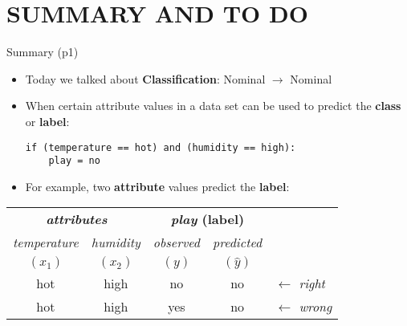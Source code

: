 \documentclass[handout]{beamer}
\newcommand{\strong}[1]{\textbf{\color{teal} #1}}
\newcommand{\stronger}[1]{\textbf{\color{purple} #1}}
\begin{document}
\section*{SUMMARY AND TO DO}
\begin{frame}[fragile]{Summary (p1)}
\begin{itemize}
\item Today we talked about \stronger{Classification}: Nominal $\rightarrow$ Nominal
\item When certain attribute values in a data set can be used to predict the \stronger{class} or \stronger{label}:
\begin{lstlisting}[numbers=none]
if (temperature == hot) and (humidity == high):
	play = no
\end{lstlisting}
\item For example, two \strong{attribute} values predict the \strong{label}:
\end{itemize}
\begin{center}
\begin{tabular}{|c|c||c|c|l}
\multicolumn{2}{|c||}{\strong{\emph{attributes}}}
                                     & \multicolumn{2}{|c|}{\strong{\emph{play} (label)}} \\
\emph{temperature} & \emph{humidity} & \emph{observed} & \emph{predicted} \\
$(x_1)$            & $(x_2)$         & $(y)$           & $(\hat{y})$ \\
\cline{1-4}
hot & high & no  & {\color{blue}no} & $\leftarrow$ \emph{right}\\
hot & high & yes & {\color{blue}no} & $\leftarrow$ \emph{wrong}\\
\cline{1-4}
\end{tabular}
\end{center}
\end{frame}
\end{document}
